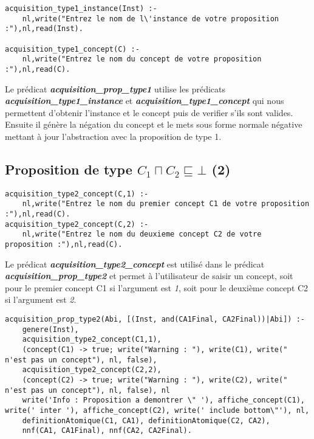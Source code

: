 \documentclass{rapportECL}
\begin{document}
\begin{lstlisting}[style=prologStyle, caption={Saisie de l'instance et du concept pour les propositions de type 1}, label={inst_conc1}]
acquisition_type1_instance(Inst) :- 
    nl,write("Entrez le nom de l\'instance de votre proposition :"),nl,read(Inst).

acquisition_type1_concept(C) :- 
    nl,write("Entrez le nom du concept de votre proposition :"),nl,read(C).
\end{lstlisting}

Le prédicat \textbf{\textit{acquisition\_prop\_type1}} utilise les prédicats \textbf{\textit{acquisition\_type1\_instance}} et \textbf{\textit{acquisition\_type1\_concept}} qui nous permettent d'obtenir l'instance et le concept puis de verifier s'ils sont valides. Ensuite il génère la négation du concept et le mets sous forme normale négative mettant à jour l'abstraction avec la proposition de type 1.

\subsection{Proposition de type \textit{\(C_1 \sqcap C_2 \sqsubseteq \bot\)} (2)}

\begin{lstlisting}[style=prologStyle, caption={Traitement de la proposition de type 2}, label={prop2}]
acquisition_type2_concept(C,1) :-
    nl,write("Entrez le nom du premier concept C1 de votre proposition :"),nl,read(C).
acquisition_type2_concept(C,2) :-
    nl,write("Entrez le nom du deuxieme concept C2 de votre proposition :"),nl,read(C).
\end{lstlisting}

Le prédicat \textbf{\textit{acquisition\_type2\_concept}} est utilisé dans le prédicat \newline \textbf{\textit{acquisition\_prop\_type2}} et permet à l'utilisateur de saisir un concept, soit pour le premier concept C1 si l'argument est \textit{1}, soit pour le deuxième concept C2 si l'argument est \textit{2}.

\begin{lstlisting}[style=prologStyle, caption={Saisie des deux concepts pour les propositions de type 2}, label={inst_conc2}]
acquisition_prop_type2(Abi, [(Inst, and(CA1Final, CA2Final))|Abi]) :-
    genere(Inst),
    acquisition_type2_concept(C1,1),
    (concept(C1) -> true; write("Warning : "), write(C1), write(" n'est pas un concept"), nl, false),
    acquisition_type2_concept(C2,2),
    (concept(C2) -> true; write("Warning : "), write(C2), write(" n'est pas un concept"), nl, false), nl
    write('Info : Proposition a demontrer \" '), affiche_concept(C1), write(' inter '), affiche_concept(C2), write(' include bottom\"'), nl,
    definitionAtomique(C1, CA1), definitionAtomique(C2, CA2),
    nnf(CA1, CA1Final), nnf(CA2, CA2Final).
\end{lstlisting}
\end{document}
